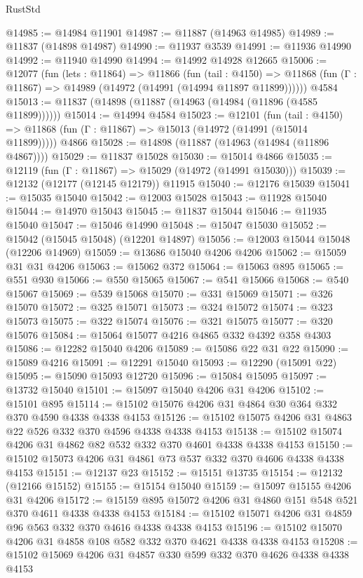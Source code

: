 \begin{lexlean}{RustStd}
\begin{coremodule}
@14985 := @14984 @11901
@14987 := @11887 (@14963 @14985)
@14989 := @11837 (@14898 @14987)
@14990 := @11937 @3539
@14991 := @11936 @14990
@14992 := @11940 @14990
@14994 := @14992 @14928 @12665
@15006 := @12077
    (fun (lets : @11864) =>
    @11866
      (fun (tail : @4150) =>
      @11868 (fun (Γ : @11867) => @14989 (@14972 (@14991 (@14994 @11897 @11899))))))
    @4584
@15013 := @11837 (@14898 (@11887 (@14963 (@14984 (@11896 (@4585 @11899))))))
@15014 := @14994 @4584
@15023 := @12101
    (fun (tail : @4150) => @11868 (fun (Γ : @11867) => @15013 (@14972 (@14991 (@15014 @11899)))))
    @4866
@15028 := @14898 (@11887 (@14963 (@14984 (@11896 @4867))))
@15029 := @11837 @15028
@15030 := @15014 @4866
@15035 := @12119 (fun (Γ : @11867) => @15029 (@14972 (@14991 @15030)))
@15039 := @12132 (@12177 (@12145 @12179)) @11915
@15040 := @12176 @15039
@15041 := @15035 @15040
@15042 := @12003 @15028
@15043 := @11928 @15040
@15044 := @14970 @15043
@15045 := @11837 @15044
@15046 := @11935 @15040
@15047 := @15046 @14990
@15048 := @15047 @15030
@15052 := @15042 (@15045 @15048) (@12201 @14897)
@15056 := @12003 @15044 @15048 (@12206 @14969)
@15059 := @13686 @15040 @4206 @4206
@15062 := @15059 @31 @31 @4206
@15063 := @15062 @372
@15064 := @15063 @895
@15065 := @551 @930
@15066 := @550 @15065
@15067 := @541 @15066
@15068 := @540 @15067
@15069 := @539 @15068
@15070 := @331 @15069
@15071 := @326 @15070
@15072 := @325 @15071
@15073 := @324 @15072
@15074 := @323 @15073
@15075 := @322 @15074
@15076 := @321 @15075
@15077 := @320 @15076
@15084 := @15064 @15077 @4216 @4865 @332 @4392 @358 @4303
@15086 := @12282 @15040 @4206
@15089 := @15086 @22 @31 @22
@15090 := @15089 @4216
@15091 := @12291 @15040
@15093 := @12290 (@15091 @22)
@15095 := @15090 @15093 @12720
@15096 := @15084 @15095
@15097 := @13732 @15040
@15101 := @15097 @15040 @4206 @31 @4206
@15102 := @15101 @895
@15114 := @15102 @15076 @4206 @31 @4864 @30 @364 @332 @370 @4590 @4338 @4338 @4153
@15126 := @15102 @15075 @4206 @31 @4863 @22 @526 @332 @370 @4596 @4338 @4338 @4153
@15138 := @15102 @15074 @4206 @31 @4862 @82 @532 @332 @370 @4601 @4338 @4338 @4153
@15150 := @15102 @15073 @4206 @31 @4861 @73 @537 @332 @370 @4606 @4338 @4338 @4153
@15151 := @12137 @23
@15152 := @15151 @13735
@15154 := @12132 (@12166 @15152)
@15155 := @15154 @15040
@15159 := @15097 @15155 @4206 @31 @4206
@15172 := @15159 @895 @15072 @4206 @31 @4860 @151 @548 @521 @370 @4611 @4338 @4338 @4153
@15184 := @15102 @15071 @4206 @31 @4859 @96 @563 @332 @370 @4616 @4338 @4338 @4153
@15196 := @15102 @15070 @4206 @31 @4858 @108 @582 @332 @370 @4621 @4338 @4338 @4153
@15208 := @15102 @15069 @4206 @31 @4857 @330 @599 @332 @370 @4626 @4338 @4338 @4153

\end{coremodule}
\end{lexlean}
